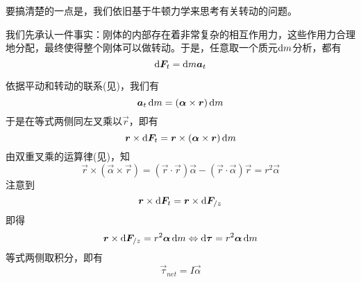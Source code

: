 \chapter[转动动力学]{}
\begin{prove}[Concepts in Dynamics\qquad$\vec{\tau}_{net}=I\vec{\alpha}$]
	要搞清楚的一点是，我们依旧基于牛顿力学来思考有关转动的问题。
	
	我们先承认一件事实：刚体的内部存在着非常复杂的相互作用力，这些作用力合理地分配，最终使得整个刚体可以做转动。于是，任意取一个质元$\dif m$分析，都有\[\dif \vec{F}_t=\dif m\vec{a}_t\]
	
	依据平动和转动的联系(见)，我们有
	\[\vec{a}_t\dif m=(\vec{\alpha}\times\vec{r})\dif m\]
	于是在等式两侧同左叉乘以$\vec{r}$，即有
	\[\vec{r}\times\dif\vec{F}_t= \vec{r}\times(\vec{\alpha}\times\vec{r})\dif m\]
	由双重叉乘的运算律(见)，知
	\[\vec{r}\times(\vec{\alpha}\times\vec{r})=(\vec{r}\cdot\vec{r})\vec{\alpha}-(\vec{r}\cdot\vec{\alpha})\vec{r}=r^2\vec{\alpha}\]
	注意到
	\[\vec{r}\times\dif\vec{F}_t=\vec{r}\times\dif\vec{F}_{/z}\]
	即得
	\[\vec{r}\times\dif\vec{F}_{/z}=r^2\vec{\alpha}\dif m\Leftrightarrow\dif\vec{\tau}=r^2\vec{\alpha}\dif m\]
	等式两侧取积分，即有
	\[\vec{\tau}_{net}=I\vec{\alpha}\]
\end{prove}

